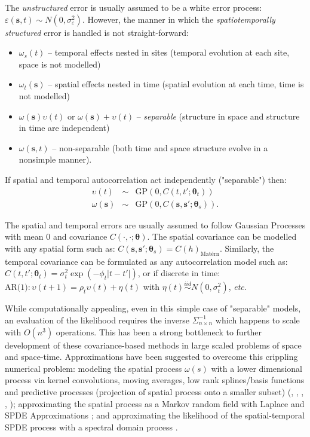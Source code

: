 \documentclass[letterpaper,portrait,11pt]{scrartcl}
\numberwithin{equation}{section}    %
\numberwithin{figure}{section}    %
\numberwithin{table}{section}       %
\begin{document}
The \textit{unstructured} error is usually assumed to be a white error process: $\varepsilon(\bm{s},t) \sim N(0, \sigma^2_\varepsilon)$. However, the manner in which the   \textit{spatiotemporally structured} error is handled is not straight-forward:

\begin{itemize}
  \item $\omega_s(t)$ -- temporal effects nested in sites (temporal evolution at each site, space is not modelled)
  \item $\omega_t(\bm{s})$ -- spatial effects nested in time (spatial evolution at each time, time is not modelled)
  \item $\omega(\bm{s})  \upsilon(t)$ or $\omega(\bm{s}) + \upsilon(t)$ -- \textit{separable} (structure in space and structure in time are independent)
  \item $\omega(\bm{s},t)$ -- non-separable (both time and space structure evolve in a nonsimple manner).
\end{itemize}

If spatial and temporal autocorrelation act independently ("separable") then: \\
\begin{eqnarray*}
  \upsilon(t) &\sim& \text{GP}(0, C(t,t'; \bm{\theta}_t))  \\
  \omega(\bm{s}) &\sim& \text{GP}(0, C(\bm{s},\bm{s}'; \bm{\theta}_s)) .
\end{eqnarray*}

The spatial and temporal errors are usually assumed to follow Gaussian Processes with mean 0 and covariance $C(\cdotp, \cdotp; \bm{\theta})$. The spatial covariance can be modelled with any spatial form such as: $C(\bm{s},\bm{s}'; \bm{\theta}_s) = C(h)_{\text{Mat\'{e}rn}}$. Similarly, the temporal covariance can be formulated as any autocorrelation model such as: $C(t,t'; \bm{\theta}_t) = \sigma^2_t \exp(-\phi_t |t-t'|)$, or if discrete in time: $\text{AR(1)}: \upsilon(t+1)=\rho_t \upsilon(t) + \eta(t)$ with $\eta(t) \stackrel{iid}{\sim} N(0,\sigma^2_t)$, \textit{etc}.


While computationally appealing, even in this simple case of "separable" models, an evaluation of the likelihood requires the inverse $\Sigma^{-1}_{n\times n}$ which happens to scale with $O(n^3)$ operations. This has been a strong bottleneck to further development of these covariance-based methods in large scaled problems of space and space-time. Approximations have been suggested to overcome this crippling numerical problem: modeling the spatial process $\omega(s)$ with a lower dimensional process via kernel convolutions, moving averages, low rank splines/basis functions and predictive processes (projection of spatial process onto a smaller subset) (\cite{solna1996time}, \cite{wikle1999dimension}, \cite{hung2004decadal}, \cite{xu2005kernel}, \cite{banerjee2014hierarchical}); approximating the spatial process as a Markov random field with Laplace and SPDE Approximations \parencite{rinla:2015}; and approximating the likelihood of the spatial-temporal SPDE process with a spectral domain process \parencite{sigrist2015stochastic}. 
\end{document}
